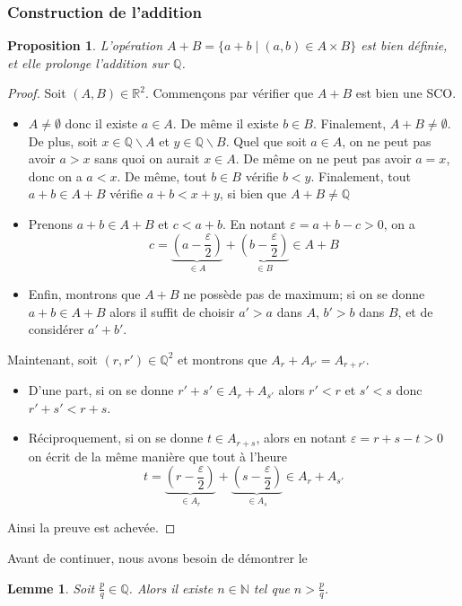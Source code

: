 \documentclass[french]{book}
\theoremstyle{plain}
\newtheorem{lem}{Lemme}[chapter]
\newtheorem{prop}{Proposition}[chapter]
\theoremstyle{definition}
\theoremstyle{remark}
\begin{document}
\subsubsection{Construction de l'addition}
\begin{prop}
	L'opération $A + B = \{a + b \mid (a, b) \in A \times B\}$ est bien définie, et elle prolonge l'addition sur $\mathbb{Q}$.
\end{prop}
\begin{proof}
	Soit $(A, B) \in \mathbb{R}^2$. Commençons par vérifier que $A + B$ est bien une SCO.
	\begin{itemize}
		\item $A \neq \emptyset$ donc il existe $a \in A$. De même il existe $b \in B$. Finalement, $A + B \neq \emptyset$. De plus, soit $x \in \mathbb{Q} \backslash A$ et $y \in \mathbb{Q} \backslash B$. Quel que soit $a \in A$, on ne peut pas avoir $a > x$ sans quoi on aurait $x \in A$. De même on ne peut pas avoir $a = x$, donc on a $a < x$. De même, tout $b \in B$ vérifie $b < y$. Finalement, tout $a + b \in A + B$ vérifie $a + b < x + y$, si bien que
		$A + B \neq \mathbb{Q}$		
		\item Prenons $a + b \in A + B$ et $c < a + b$. En notant $\varepsilon = a + b - c > 0$, on a $$c = \underbrace{\left(a - \frac{\varepsilon}{2}\right)}_{\in A} + \underbrace{\left(b - \frac{\varepsilon}{2}\right)}_{\in B} \in A + B$$
		\item Enfin, montrons que $A + B$ ne possède pas de maximum; si on se donne $a + b \in A + B$ alors il suffit de choisir $a' > a$ dans $A$, $b' > b$ dans $B$, et de considérer $a' + b'$.
	\end{itemize}
	Maintenant, soit $(r, r') \in \mathbb{Q}^2$ et montrons que $A_r + A_{r'} = A_{r + r'}$.
	\begin{itemize}
		\item D'une part, si on se donne $r' + s' \in A_r + A_{s'}$ alors $r' < r$ et $s' < s$ donc $r' + s' < r + s$.
		\item Réciproquement, si on se donne $t \in A_{r + s}$, alors en notant $\varepsilon = r + s - t > 0$ on écrit de la même manière que tout à l'heure $$t = \underbrace{\left(r - \frac{\varepsilon}{2}\right)}_{\in A_r} + \underbrace{\left(s - \frac{\varepsilon}{2}\right)}_{\in A_{s}} \in A_r + A_{s'}$$
	\end{itemize}
	Ainsi la preuve est achevée.
\end{proof}
Avant de continuer, nous avons besoin de démontrer le
\begin{lem}
	Soit $\frac{p}{q} \in \mathbb{Q}$. Alors il existe $n \in \mathbb{N}$ tel que $n >\frac{p}{q}$.
\end{lem}
\end{document}
